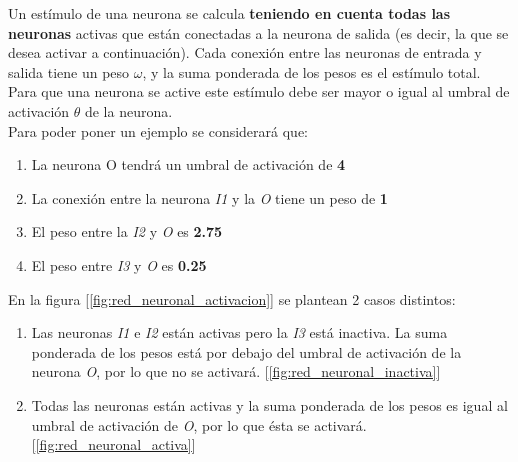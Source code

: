Un estímulo de una neurona se calcula \textbf{teniendo en cuenta todas las neuronas} activas que están conectadas a la neurona de salida (es decir, la que se desea activar a continuación). Cada conexión entre las neuronas de entrada y salida tiene un peso $\omega$, y la suma ponderada de los pesos es el estímulo total. Para que una neurona se active este estímulo debe ser mayor o igual al umbral de activación $\theta$ de la neurona. \\

Para poder poner un ejemplo se considerará que:

\begin{enumerate}
    \item La neurona O tendrá un umbral de activación de \textbf{4}
    \item La conexión entre la neurona \textit{I1} y la \textit{O} tiene un peso de \textbf{1}
    \item El peso entre la \textit{I2} y \textit{O} es \textbf{2.75}
    \item El peso entre \textit{I3} y \textit{O} es \textbf{0.25}
\end{enumerate} 

En la figura [\ref{fig:red_neuronal_activacion}] se plantean 2 casos distintos: 

\begin{enumerate}
    \item Las neuronas \textit{I1} e \textit{I2} están activas pero la \textit{I3} está inactiva. La suma ponderada de los pesos está por debajo del umbral de activación de la neurona \textit{O}, por lo que no se activará. [\ref{fig:red_neuronal_inactiva}]
    \item Todas las neuronas están activas y la suma ponderada de los pesos es igual al umbral de activación de \textit{O}, por lo que ésta se activará. [\ref{fig:red_neuronal_activa}]
\end{enumerate}

